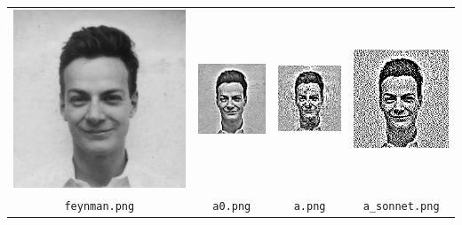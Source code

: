 \begin{tabular}{cccc}
	\includegraphics{i/feynman.png} &
	\includegraphics{a0.png} &
	\includegraphics{a.png} &
	\includegraphics{a_sonnet.png} \\
	\verb+feynman.png+ &
	\verb+a0.png+ &
	\verb+a.png+ &
	\verb+a_sonnet.png+
\end{tabular}

